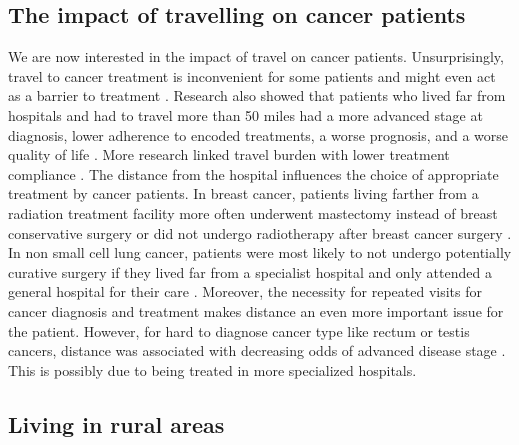 \subsection{The impact of travelling on cancer patients}

We are now interested in the impact of travel on cancer patients. Unsurprisingly, travel to cancer treatment is inconvenient for some patients and might even act as a barrier to treatment \cite{payne_impact_2000}. Research also showed that patients who lived far from hospitals and had to travel more than 50 miles had a more advanced stage at diagnosis, lower adherence to encoded treatments, a worse prognosis, and a worse quality of life \cite{ambroggi_distance_2015}. More research linked travel burden with lower treatment compliance \cite{dutta_evaluation_2013,guidry_transportation_1997}. The distance from the hospital influences the choice of appropriate treatment by cancer patients. In breast cancer, patients living farther from a radiation treatment facility more often underwent mastectomy instead of breast conservative surgery \cite{schroen_impact_2005,celaya_travel_2006,voti_treatment_2006,meden_relationship_2002,nattinger_relationship_2001,boscoe_geographic_2011} or did not undergo radiotherapy after breast cancer surgery \cite{satasivam_dilemma_2014,schroen_impact_2005,celaya_travel_2006}. In non small cell lung cancer, patients were most likely to not undergo potentially curative surgery if they lived far from a specialist hospital and only attended a general hospital for their care \cite{tracey_patients_2015}. Moreover, the necessity for repeated visits for cancer diagnosis and treatment makes distance an even more important issue for the patient\cite{guidry_transportation_1997}. However, for hard to diagnose cancer type like rectum or testis cancers, distance was associated with decreasing odds of advanced disease stage \cite{virgilsen_travel_2019}. This is possibly due to being treated in more specialized hospitals.

\subsection{Living in rural areas}

